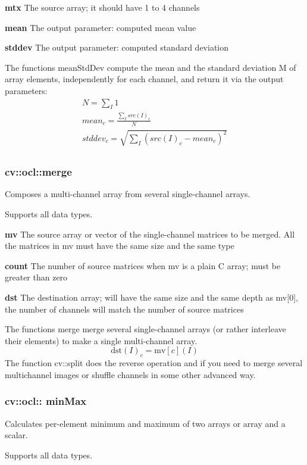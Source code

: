\documentclass{article}
\begin{document}
\textbf{mtx }The source array; it should have 1 to 4 channels

\textbf{mean }The output parameter: computed mean value

\textbf{stddev }The output parameter: computed standard deviation

The functions meanStdDev compute the mean and the standard deviation M of
array elements, independently for each channel, and return it via the output
parameters:
\[
\begin{array}{l}
 N=\sum\nolimits_I 1 \\
 mean_c =\frac{\sum\nolimits_I {src(I)_c } }{N} \\
 stddev_c =\sqrt {\sum\nolimits_I {(src(I)_c -mean_c )^2} } \\
 \end{array}
\]
\newpage

\subsubsection{cv::ocl::merge }
\label{subsubsec:mylabel20}
Composes a multi-channel array from several single-channel arrays.

Supports all data types.

\textbf{mv }The source array or vector of the single-channel matrices to be
merged. All the matrices in mv must have the same size and the same type

\textbf{count }The number of source matrices when mv is a plain C array;
must be greater than zero

\textbf{dst }The destination array; will have the same size and the same
depth as mv[0], the number of channels will match the number of source
matrices

The functions merge merge several single-channel arrays (or rather
interleave their elements) to make a single multi-channel array.
\[
\mbox{dst}(I)_c =\mbox{mv}\left[ c \right](I)
\]
The function cv::split does the reverse operation and if you need to merge
several multichannel images or shuffle channels in some other advanced way.

\newpage

\subsubsection{cv::ocl:: minMax }
\label{subsubsec:mylabel21}
Calculates per-element minimum and maximum of two arrays or array and a
scalar.

Supports all data types.
\end{document}
